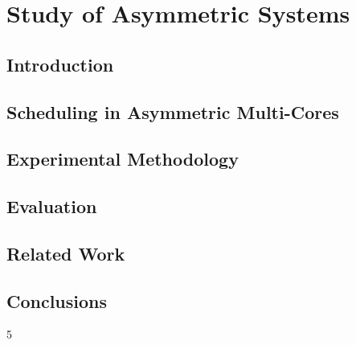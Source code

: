 \chapter{Study of Asymmetric Systems}

\section{Introduction}
\label{sec:intro}


\section{Scheduling in Asymmetric Multi-Cores}
\label{sec:scheduling}


\section{Experimental Methodology}
\label{sec:experimental}


\section{Evaluation}
\label{sec:evaluation}


\section{Related Work}
\label{sec:related}


\section{Conclusions}
\label{sec:conclusions}


% 
5
